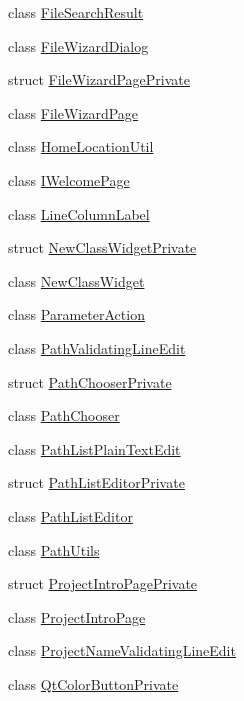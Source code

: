 \begin{DoxyCompactItemize}
class \hyperlink{class_utils_1_1_file_search_result}{\-File\-Search\-Result}
\item 
class \hyperlink{class_utils_1_1_file_wizard_dialog}{\-File\-Wizard\-Dialog}
\item 
struct \hyperlink{struct_utils_1_1_file_wizard_page_private}{\-File\-Wizard\-Page\-Private}
\item 
class \hyperlink{class_utils_1_1_file_wizard_page}{\-File\-Wizard\-Page}
\item 
class \hyperlink{class_utils_1_1_home_location_util}{\-Home\-Location\-Util}
\item 
class \hyperlink{class_utils_1_1_i_welcome_page}{\-I\-Welcome\-Page}
\item 
class \hyperlink{class_utils_1_1_line_column_label}{\-Line\-Column\-Label}
\item 
struct \hyperlink{struct_utils_1_1_new_class_widget_private}{\-New\-Class\-Widget\-Private}
\item 
class \hyperlink{class_utils_1_1_new_class_widget}{\-New\-Class\-Widget}
\item 
class \hyperlink{class_utils_1_1_parameter_action}{\-Parameter\-Action}
\item 
class \hyperlink{class_utils_1_1_path_validating_line_edit}{\-Path\-Validating\-Line\-Edit}
\item 
struct \hyperlink{struct_utils_1_1_path_chooser_private}{\-Path\-Chooser\-Private}
\item 
class \hyperlink{class_utils_1_1_path_chooser}{\-Path\-Chooser}
\item 
class \hyperlink{class_utils_1_1_path_list_plain_text_edit}{\-Path\-List\-Plain\-Text\-Edit}
\item 
struct \hyperlink{struct_utils_1_1_path_list_editor_private}{\-Path\-List\-Editor\-Private}
\item 
class \hyperlink{class_utils_1_1_path_list_editor}{\-Path\-List\-Editor}
\item 
class \hyperlink{class_utils_1_1_path_utils}{\-Path\-Utils}
\item 
struct \hyperlink{struct_utils_1_1_project_intro_page_private}{\-Project\-Intro\-Page\-Private}
\item 
class \hyperlink{class_utils_1_1_project_intro_page}{\-Project\-Intro\-Page}
\item 
class \hyperlink{class_utils_1_1_project_name_validating_line_edit}{\-Project\-Name\-Validating\-Line\-Edit}
\item 
class \hyperlink{class_utils_1_1_qt_color_button_private}{\-Qt\-Color\-Button\-Private}

\end{DoxyCompactItemize}
